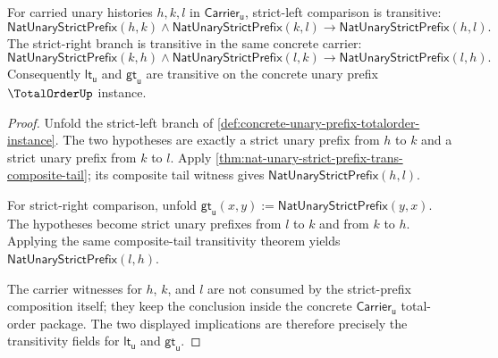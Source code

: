 \begin{theorem}
\label{thm:totalorder-strict-branch-transitivity}
For carried unary histories $h,k,l$ in $\mathsf{Carrier}_{\mathsf{u}}$,
strict-left comparison is transitive:
$$
\mathsf{NatUnaryStrictPrefix}(h,k)\land
\mathsf{NatUnaryStrictPrefix}(k,l)
\to
\mathsf{NatUnaryStrictPrefix}(h,l).
$$
The strict-right branch is transitive in the same concrete carrier:
$$
\mathsf{NatUnaryStrictPrefix}(k,h)\land
\mathsf{NatUnaryStrictPrefix}(l,k)
\to
\mathsf{NatUnaryStrictPrefix}(l,h).
$$
Consequently $\mathsf{lt}_{\mathsf{u}}$ and $\mathsf{gt}_{\mathsf{u}}$ are
transitive on the concrete unary prefix $\TotalOrderUp$ instance.
\end{theorem}
\begin{proof}
Unfold the strict-left branch of
\autoref{def:concrete-unary-prefix-totalorder-instance}. The two hypotheses are
exactly a strict unary prefix from $h$ to $k$ and a strict unary prefix from $k$
to $l$. Apply
\autoref{thm:nat-unary-strict-prefix-trans-composite-tail}; its composite tail
witness gives $\mathsf{NatUnaryStrictPrefix}(h,l)$.

For strict-right comparison, unfold
$\mathsf{gt}_{\mathsf{u}}(x,y):=\mathsf{NatUnaryStrictPrefix}(y,x)$. The
hypotheses become strict unary prefixes from $l$ to $k$ and from $k$ to $h$.
Applying the same composite-tail transitivity theorem yields
$\mathsf{NatUnaryStrictPrefix}(l,h)$.

The carrier witnesses for $h$, $k$, and $l$ are not consumed by the strict-prefix
composition itself; they keep the conclusion inside the concrete
$\mathsf{Carrier}_{\mathsf{u}}$ total-order package. The two displayed
implications are therefore precisely the transitivity fields for
$\mathsf{lt}_{\mathsf{u}}$ and $\mathsf{gt}_{\mathsf{u}}$.
\end{proof}

